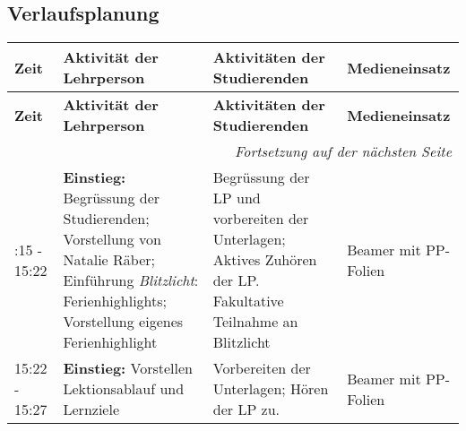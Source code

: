 \documentclass[
11pt,
captions=tableheading,
smallheadings,
headsepline,
footsepline, 
captions=tableheading,
parskip=half-,
]{scrartcl}
\begin{document}
\begin{landscape}
    \subsection{Verlaufsplanung}
    \begin{longtable}{@{}l|p{8.75cm}p{7.75cm}p{5.25cm}@{}}
        \toprule
        \textbf{Zeit} & \textbf{Aktivität der Lehrperson}                                                                                                                                & \textbf{Aktivitäten der Studierenden}                                                                          & \textbf{Medieneinsatz}                                                            \\
        \midrule
        \endfirsthead
        \toprule
        \textbf{Zeit} & \textbf{Aktivität der Lehrperson}                                                                                                                                & \textbf{Aktivitäten der Studierenden}                                                                          & \textbf{Medieneinsatz}                                                            \\
        \midrule
        \endhead
        \midrule
        \multicolumn{4}{r}{\textit{Fortsetzung auf der nächsten Seite}}                                                                                                                                                                                                                                                                                                                       \\
        \midrule
        \endfoot
        \bottomrule
        \endlastfoot
        \midrule
        15:15 - 15:22 & \textbf{Einstieg: }Begrüssung der Studierenden; Vorstellung von Natalie Räber; Einführung \textit{Blitzlicht}: Ferienhighlights; Vorstellung eigenes Ferienhighlight               & Begrüssung der LP und vorbereiten der Unterlagen; Aktives Zuhören der LP. Fakultative Teilnahme an Blitzlicht & Beamer mit PP-Folien                                                              \\
        \midrule
        15:22 - 15:27 & \textbf{Einstieg: }Vorstellen Lektionsablauf und Lernziele                                                                                                       & Vorbereiten der Unterlagen; Hören der LP zu.                                                                   & Beamer mit PP-Folien                                                              \\


\end{longtable}
\end{landscape}
\end{document}
